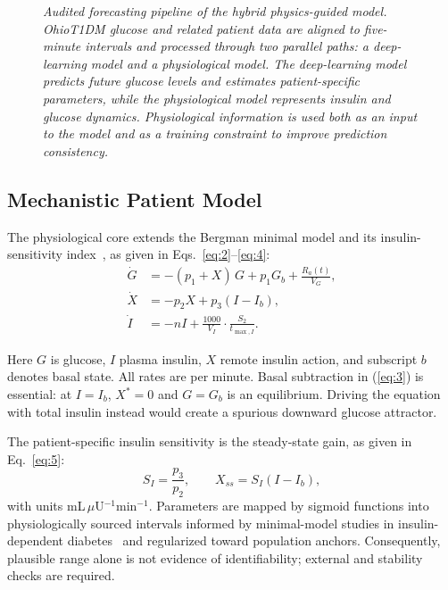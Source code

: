 \documentclass[journal]{IEEEtran}
\begin{document}
\begin{figure}[p]
\begin{tikzpicture}
\end{tikzpicture}

\caption{\small\textit{Audited forecasting pipeline of the hybrid physics-guided model. OhioT1DM glucose and related patient data are aligned to five-minute intervals and processed through two parallel paths: a deep-learning model and a physiological model. The deep-learning model predicts future glucose levels and estimates patient-specific parameters, while the physiological model represents insulin and glucose dynamics. Physiological information is used both as an input to the model and as a training constraint to improve prediction consistency.
}}
\label{fig:pipeline}
\end{figure}

\subsection{Mechanistic Patient Model}

The physiological core extends the Bergman minimal model and its insulin-sensitivity index~\cite{ref1,ref32}, as given in Eqs.~\eqref{eq:2}--\eqref{eq:4}:
\begin{align}
\dot{G} &= -(p_1 + X)\,G + p_1 G_b + \frac{R_a(t)}{V_G}, \label{eq:2}\\
\dot{X} &= -p_2 X + p_3 (I - I_b), \label{eq:3}\\
\dot{I} &= -nI + \frac{1000}{V_I}\cdot\frac{S_2}{t_{\max,I}}. \label{eq:4}
\end{align}

Here $G$ is glucose, $I$ plasma insulin, $X$ remote insulin action, and subscript $b$ denotes basal state. All rates are per minute. Basal subtraction in (\ref{eq:3}) is essential: at $I = I_b$, $X^* = 0$ and $G = G_b$ is an equilibrium. Driving the equation with total insulin instead would create a spurious downward glucose attractor.

The patient-specific insulin sensitivity is the steady-state gain, as given in Eq.~\eqref{eq:5}:
\begin{equation}
S_I = \frac{p_3}{p_2}, \qquad X_{ss} = S_I (I - I_b),
\label{eq:5}
\end{equation}
with units mL\,$\mu$U$^{-1}$min$^{-1}$. Parameters are mapped by sigmoid functions into physiologically sourced intervals informed by minimal-model studies in insulin-dependent diabetes~\cite{ref33} and regularized toward population anchors. Consequently, plausible range alone is not evidence of identifiability; external and stability checks are required.
\end{document}
